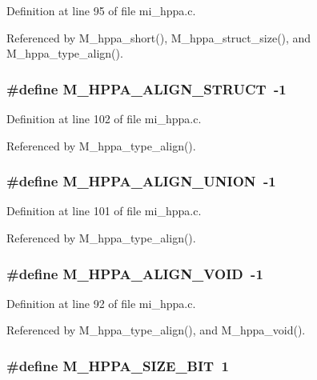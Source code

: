 Definition at line 95 of file mi\_\-hppa.c.

Referenced by M\_\-hppa\_\-short(), M\_\-hppa\_\-struct\_\-size(), and M\_\-hppa\_\-type\_\-align().
\subsubsection{\setlength{\rightskip}{0pt plus 5cm}\#define M\_\-HPPA\_\-ALIGN\_\-STRUCT~-1}\label{mi__hppa_8c_9d584311e59b5c53c5130e4fa37c5b7d}




Definition at line 102 of file mi\_\-hppa.c.

Referenced by M\_\-hppa\_\-type\_\-align().
\subsubsection{\setlength{\rightskip}{0pt plus 5cm}\#define M\_\-HPPA\_\-ALIGN\_\-UNION~-1}\label{mi__hppa_8c_bdd7b49dc83dfc933dfff20508d81420}




Definition at line 101 of file mi\_\-hppa.c.

Referenced by M\_\-hppa\_\-type\_\-align().
\subsubsection{\setlength{\rightskip}{0pt plus 5cm}\#define M\_\-HPPA\_\-ALIGN\_\-VOID~-1}\label{mi__hppa_8c_c12a611b00ea90c8f552e958d15a766f}




Definition at line 92 of file mi\_\-hppa.c.

Referenced by M\_\-hppa\_\-type\_\-align(), and M\_\-hppa\_\-void().
\subsubsection{\setlength{\rightskip}{0pt plus 5cm}\#define M\_\-HPPA\_\-SIZE\_\-BIT~1}\label{mi__hppa_8c_dc56e3c77d9abce22fcf85243daea802}




